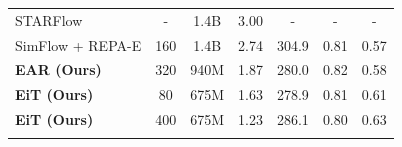 \documentclass[]{bytedance_seed}
\begin{document}
\begin{table}[]
{\begin{tabular}{lcccccc}
STARFlow~\citep{starflow} & - & 1.4B & 3.00 & -& -& - \\
\arrayrulecolor{black}\midrule
SimFlow + REPA-E & 160 & 1.4B & 2.74 & 304.9 & 0.81 & 0.57 \\
\rowcolor{blue!8} \textbf{EAR (Ours)} & 320 & 940M & 1.87 & 280.0 & 0.82 & 0.58 \\
\rowcolor{blue!8} \textbf{EiT (Ours)} & 80 & 675M & 1.63 & 278.9 & 0.81 & 0.61\\
\rowcolor{blue!8} \textbf{EiT (Ours)} & 400 & 675M & 1.23 & 286.1 & 0.80 & 0.63 \\
\arrayrulecolor{black}\bottomrule
\end{tabular}
}
\label{tab:imagenet512_sota}
\end{table}
\end{document}
